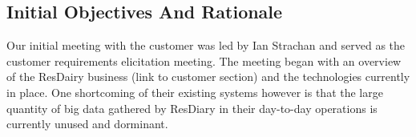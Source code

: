 \documentclass{l3proj}
\begin{document}
\subsection{Initial Objectives And Rationale}
\label{initobjectives}






Our initial meeting with the customer was led by Ian Strachan and served as the customer requirements elicitation meeting. The meeting began with an overview of the ResDairy business (link to customer section) and the technologies currently in place. One shortcoming of their existing systems however is that the large quantity of big data gathered by ResDiary in their day-to-day operations is currently unused and dorminant. 
\end{document}
